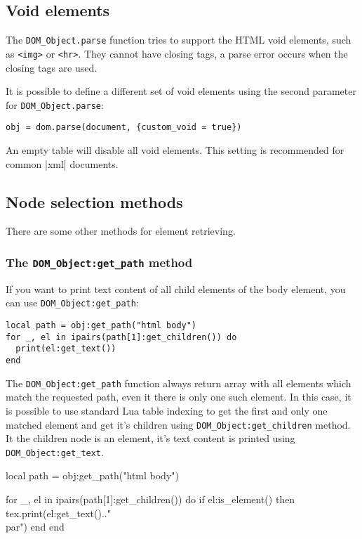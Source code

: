 \documentclass{ltxdoc}
\begin{document}
\subsection{Void elements}

The \verb|DOM_Object.parse| function tries to support the HTML void elements,
such as \verb|<img>| or \verb|<hr>|. They cannot have closing tags, a parse
error occurs when the closing tags are used.

It is possible to define a different set of void elements using the second parameter 
for \verb|DOM_Object.parse|:

\begin{verbatim}
obj = dom.parse(document, {custom_void = true})
\end{verbatim}

An empty table will disable all void elements. This setting is recommended for common |xml| documents.


\subsection{Node selection methods}
There are some other methods for element retrieving. 

\subsubsection{The \texttt{DOM\_Object:get\_path} method}
If you want to print text content of all child elements of the body element, you can use \verb|DOM_Object:get_path|:

\begin{verbatim}
local path = obj:get_path("html body")
for _, el in ipairs(path[1]:get_children()) do
  print(el:get_text())
end
\end{verbatim}

The \verb|DOM_Object:get_path| function always return array with all elements
which match the requested path, even it there is only one such element. In this
case, it is possible to use standard Lua table indexing to get the first and
only one matched element and get it's children using
\verb|DOM_Object:get_children| method. It the children node is an element, it's
text content is printed using \verb|DOM_Object:get_text|.



\begin{framed}
  \begin{luacode*}
local path = obj:get_path("html body")

for _, el in ipairs(path[1]:get_children()) do
  if el:is_element() then
    tex.print(el:get_text().."\\par")
  end
end
  \end{luacode*}
\end{framed}
\end{document}
